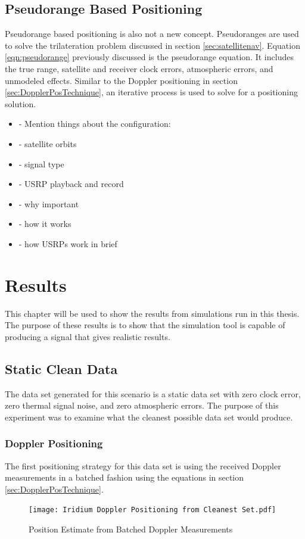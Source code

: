 \documentclass[12pt]{report}
\begin{document}
\section{Pseudorange Based Positioning} \label{sec:PseudorangePosTechnique}
Pseudorange based positioning is also not a new concept. Pseudoranges are used to solve the trilateration problem discussed in section \ref{sec:satellitenav}. Equation \ref{eqn:pseudorange} previously discussed is the pseudorange equation. It includes the true range, satellite and receiver clock errors, atmospheric errors, and unmodeled effects. Similar to the Doppler positioning in section \ref{sec:DopplerPosTechnique}, an iterative process is used to solve for a positioning solution. 
\begin{itemize}
    \item     - Mention things about the configuration:
    \item     - satellite orbits
    \item     - signal type
    \item     - USRP playback and record
    \item     - why important
    \item     - how it works
    \item     - how USRPs work in brief


\end{itemize}


\chapter{Results}

This chapter will be used to show the results from simulations run in this thesis. The purpose of these results is to show that the simulation tool is capable of producing a signal that gives realistic results. 

\section{Static Clean Data}
The data set generated for this scenario is a static data set with zero clock error, zero thermal signal noise, and zero atmospheric errors. The purpose of this experiment was to examine what the cleanest possible data set would produce.  
\subsection{Doppler Positioning}
The first positioning strategy for this data set is using the received Doppler measurements in a batched fashion using the equations in section \ref{sec:DopplerPosTechnique}. 
\begin{figure}[h!]
    \centering
    \texttt{[image: Iridium Doppler Positioning from Cleanest Set.pdf]}
    \caption{Position Estimate from Batched Doppler Measurements}
    \label{fig:cleaniriddopgeo}
\end{figure}
\end{document}

